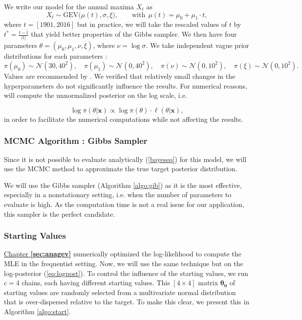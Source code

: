 We write our model for the annual maxima $X_t$ as  
\begin{equation*}
X_{t}\sim \text{GEV}\big(\mu(t), \sigma, \xi\big), \qquad \text{with} \ \ \mu(t)= \mu_0+\mu_1\cdot t,
\end{equation*}
where $t=[1901,2016]$ but in practice, we will take the rescaled values of $t$ by $t^{*} = \frac{t - \bar{t} }{|t|}$ that yield better properties of the  Gibbs sampler. 
We then have four parameters $\theta=(\mu_0,\mu_1,\nu,\xi)$, where $\nu=\log\sigma$. We take independent vague prior distributions for each parameters :
\begin{equation*}
\pi(\mu_0)\sim\mathcal{N}(30,40^2),\quad \pi(\mu_1)\sim\mathcal{N}(0,40^2),\quad \pi(\nu)\sim\mathcal{N}(0,10^2),\quad
\pi(\xi)\sim\mathcal{N}(0,10^2).
\end{equation*}
Values are recommended by \citet[chap.13]{dey_extreme_2016}. We verified that relatively small changes in the hyperparameters do not significantly influence the results.
For numerical reasons, will compute the unnormalized posterior on the log scale, i.e.

\begin{equation}\label{eq:logpost}
\log\pi(\theta|\boldsymbol{x})\propto \log\pi(\theta)\cdot \ell(\theta|\boldsymbol{x}),
\end{equation}
in order to facilitate the numerical computations while not affecting the results.


\subsubsection*{MCMC Algorithm : Gibbs Sampler}

Since it is not possible to evaluate analytically (\ref{bayeseq}) for this model, we will use the MCMC method to approximate the true target posterior distribution. 

We will use the Gibbs sampler (Algorithm \ref{algo:gib}) as it is the most effective, especially in a nonstationary setting, i.e. when the number of parameters to evaluate is high. As the computation time is not a real issue for our application, this sampler is the perfect candidate.



\subsubsection*{Starting Values}

\hyperref[sec:anagev]{Chapter \textbf{\ref{sec:anagev}}} numerically optimized the log-likelihood to compute the MLE in the frequentist setting. Now, we will use the same technique but on the log-posterior (\ref{eq:logpost}).
To control the influence of the starting values, we run $c=4$ chains, each having different starting values. This $[4\times 4]$ matrix $\boldsymbol{\theta_0}$ of starting values are randomly selected from a multivariate normal distribution that is over-dispersed relative to the target. To make this clear, we present this in Algorithm \ref{algo:start}.

